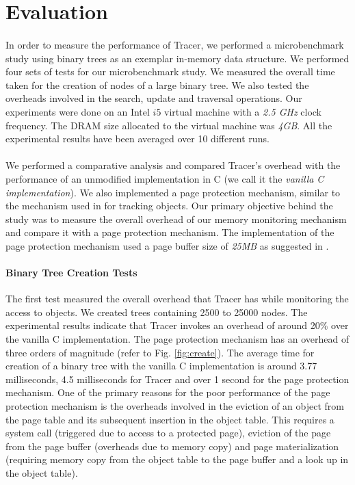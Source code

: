 \section{Evaluation}
\label{sec:eval}
\paragraph{}
In order to measure the performance of Tracer, we performed a microbenchmark study using binary trees as an exemplar in-memory data structure. We performed four sets of tests for our microbenchmark study. We measured the overall time taken for the creation of nodes of a large binary tree. We also tested the overheads involved in the search, update and traversal operations. Our experiments were done on an Intel $i5$ virtual machine with a {\emph{2.5 GHz}} clock frequency. The DRAM size allocated to the virtual machine was {\emph{4GB}}. All the experimental results have been averaged over 10 different runs. 

\paragraph{}
We performed a comparative analysis and compared Tracer's overhead with the performance of an unmodified implementation in C (we call it the {\emph{vanilla C implementation}}). We also implemented a page protection mechanism, similar to the mechanism used in \cite{SSDAlloc} for tracking objects. Our primary objective behind the study was to measure the overall overhead of our memory monitoring mechanism and compare it with a page protection mechanism. The implementation of the page protection mechanism used a page buffer size of {\emph{25MB}} as suggested in \cite{SSDAlloc}.

\paragraph{Binary Tree Creation Tests}
The first test measured the overall overhead that Tracer has while monitoring the access to objects. We created trees containing 2500 to 25000 nodes. The experimental results indicate that Tracer invokes an overhead of around 20\% over the vanilla C implementation. The page protection mechanism has an overhead of three orders of magnitude (refer to Fig. \ref{fig:create}). The average time for creation of a binary tree with the vanilla C implementation is around 3.77 milliseconds, 4.5 milliseconds for Tracer and over 1 second for the page protection mechanism. One of the primary reasons for the poor performance of the page protection mechanism is the overheads involved in the eviction of an object from the page table and its subsequent insertion in the object table. This requires a system call (triggered due to access to a protected page), eviction of the page from the page buffer (overheads due to memory copy) and page materialization (requiring memory copy from the object table to the page buffer and a look up in the object table). 

